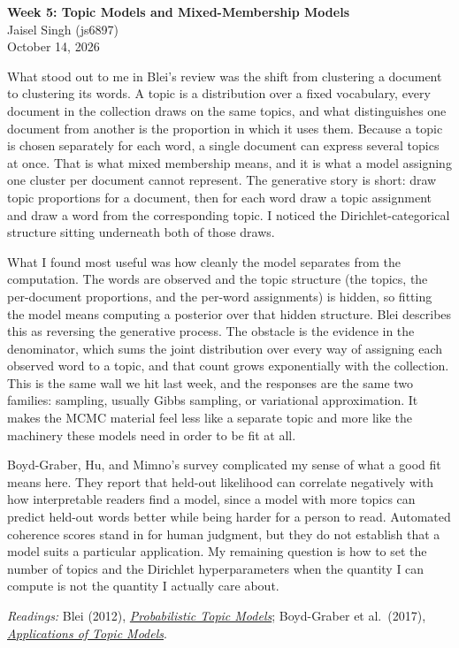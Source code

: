 \documentclass[12pt]{article}
\begin{document}
\begin{flushleft}
\textbf{Week 5: Topic Models and Mixed-Membership Models} \\
Jaisel Singh (js6897) \\
October 14, 2026
\end{flushleft}

\vspace{0.1in}

What stood out to me in Blei's review was the shift from clustering a document to
clustering its words. A topic is a distribution over a fixed vocabulary, every
document in the collection draws on the same topics, and what distinguishes one
document from another is the proportion in which it uses them. Because a topic is
chosen separately for each word, a single document can express several topics at
once. That is what mixed membership means, and it is what a model assigning one
cluster per document cannot represent. The generative story is short: draw topic
proportions for a document, then for each word draw a topic assignment and draw a
word from the corresponding topic. I noticed the Dirichlet-categorical structure
sitting underneath both of those draws.

What I found most useful was how cleanly the model separates from the computation.
The words are observed and the topic structure (the topics, the per-document
proportions, and the per-word assignments) is hidden, so fitting the model means
computing a posterior over that hidden structure. Blei describes this as reversing
the generative process. The obstacle is the evidence in the denominator, which sums
the joint distribution over every way of assigning each observed word to a topic,
and that count grows exponentially with the collection. This is the same wall we
hit last week, and the responses are the same two families: sampling, usually Gibbs
sampling, or variational approximation. It makes the MCMC material feel less like a
separate topic and more like the machinery these models need in order to be fit at all.

Boyd-Graber, Hu, and Mimno's survey complicated my sense of what a good fit means
here. They report that held-out likelihood can correlate negatively with how
interpretable readers find a model, since a model with more topics can predict
held-out words better while being harder for a person to read. Automated coherence
scores stand in for human judgment, but they do not establish that a model suits a
particular application. My remaining question is how to set the number of topics and
the Dirichlet hyperparameters when the quantity I can compute is not the quantity I
actually care about.

\vspace{0.05in}
{\footnotesize
\textit{Readings:} Blei (2012), \href{https://www.cs.columbia.edu/~blei/fogm/readings/Blei2012.pdf}{\emph{Probabilistic Topic Models}};
Boyd-Graber et al.\ (2017), \href{https://www.nowpublishers.com/article/Details/INR-030}{\emph{Applications of Topic Models}}.
\par}
\end{document}
